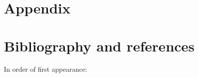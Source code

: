 \documentclass[11pt,a4paper]{article}
\begin{document}
	
	
	
	
	
	\appendix	
	
	
	
	\clearpage
	\section{Appendix}
	
	
	
	\clearpage
	\section{Bibliography and references}
	In order of first appearance:
	\printbibliography[heading=none]
	
	\newpage
	
\end{document}
